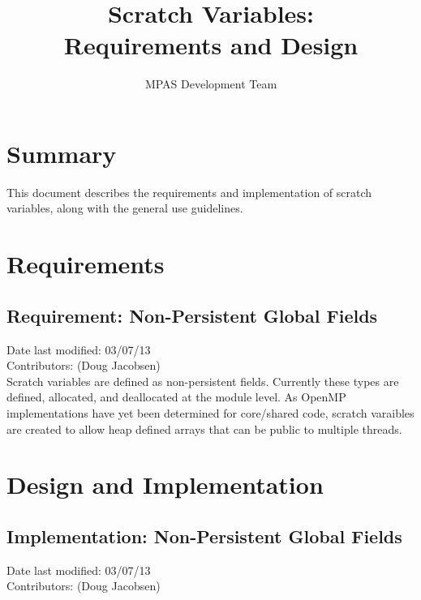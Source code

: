 \documentclass[11pt]{report}
\begin{document}
\title{Scratch Variables: \\
Requirements and Design}
\author{MPAS Development Team}

\maketitle
\tableofcontents


\chapter{Summary}


This document describes the requirements and implementation of scratch variables, along with the general use guidelines. 


\chapter{Requirements}

\section{Requirement: Non-Persistent Global Fields}
Date last modified: 03/07/13 \\
Contributors: (Doug Jacobsen) \\

Scratch variables are defined as non-persistent fields. Currently these types
are defined, allocated, and deallocated at the module level. As OpenMP
implementations have yet been determined for core/shared code, scratch
varaibles are created to allow heap defined arrays that can be public to
multiple threads.


\chapter{Design and Implementation}

\section{Implementation: Non-Persistent Global Fields}
Date last modified: 03/07/13 \\
Contributors: (Doug Jacobsen) \\
\end{document}
